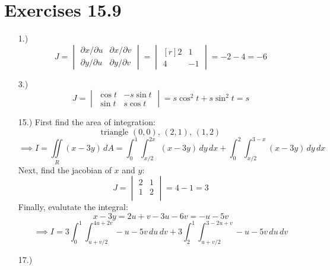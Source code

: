 \documentclass[12pt]{article}
\newcommand{\pderv}[2]{{\partial#1}/{\partial#2}}
\begin{document}
\section*{Exercises 15.9}
\begin{itemize}
    \item [1.)] \[J=\begin{vmatrix}
        \pderv{x}{u} & \pderv{x}{v} \\
        \pderv{y}{u} & \pderv{y}{v}
    \end{vmatrix}=\begin{vmatrix*}[r]
        2 & 1 \\
        4 & -1
    \end{vmatrix*}=-2-4=-6\]

    \item [3.)] \[J=\begin{vmatrix}
        \cos t & -s\sin t \\
        \sin t & s\cos t
    \end{vmatrix}=s\cos^2t+s\sin^2t=s\]

    \item [15.)] First find the area of integration:
    \[\text{triangle }(0,0),\,(2,1),\,(1,2)\]
    \[\implies I=\iint\limits_R(x-3y)\,dA=\int^1_0\int^{2x}_{x/2}(x-3y)\,dy\,dx+\int^2_0\int^{3-x}_{x/2}(x-3y)\,dy\,dx\]
    Next, find the jacobian of $x$ and $y$:
    \[J=\begin{vmatrix}
        2 & 1 \\
        1 & 2 \\
    \end{vmatrix}=4-1=3\]
    Finally, evalutate the integral:
    \[x-3y=2u+v-3u-6v=-u-5v\]
    \[\implies I=3\int^1_0\int^{4u+2v}_{u+v/2}-u-5v\,du\,dv+3\int^1_2\int^{3-2u+v}_{u+v/2}-u-5v\,du\,dv\]

    \item [17.)]

\end{itemize}
\end{document}
